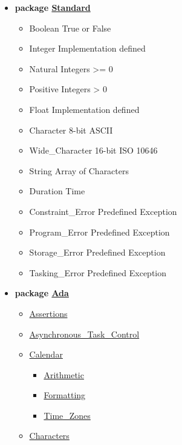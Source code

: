 \documentclass[english]{article}
\begin{document}
\begin{scriptsize}
\begin{multicols*}{5}
\begin{itemize}[leftmargin=0mm]
\item[] \textbf{package \href{http://www.ada-auth.org/standards/22rm/html/RM-A-1.html}{Standard}}
  \begin{itemize}[leftmargin=5mm]
  \item[] Boolean True or False
  \item[] Integer Implementation defined
  \item[] Natural Integers >= 0
  \item[] Positive Integers > 0
  \item[] Float Implementation defined
  \item[] Character 8-bit ASCII
  \item[] Wide\_Character 16-bit ISO 10646
  \item[] String Array of Characters
  \item[] Duration Time
  \item[] Constraint\_Error Predefined Exception
  \item[] Program\_Error Predefined Exception
  \item[] Storage\_Error Predefined Exception
  \item[] Tasking\_Error Predefined Exception
  \end{itemize}
\item[] \textbf{package \href{http://www.ada-auth.org/standards/22rm/html/RM-A-2.html}{Ada}}
  \begin{itemize}[leftmargin=5mm]
  \item[] \href{http://www.ada-auth.org/standards/22rm/html/RM-11-4-2.html}{Assertions}
  \item[] \href{http://www.ada-auth.org/standards/22rm/html/RM-D-11.html}{Asynchronous\_Task\_Control}
  \item[] \href{http://www.ada-auth.org/standards/22rm/html/RM-9-6.html}{Calendar}
	\begin{itemize}[leftmargin=5mm]
	\item[] \href{http://www.ada-auth.org/standards/22rm/html/RM-9-6-1.html}{Arithmetic}
	\item[] \href{http://www.ada-auth.org/standards/22rm/html/RM-9-6-1.html}{Formatting}
	\item[] \href{http://www.ada-auth.org/standards/22rm/html/RM-9-6-1.html}{Time\_Zones}
	\end{itemize}
  \item[] \href{http://www.ada-auth.org/standards/22rm/html/RM-A-3-1.html}{Characters}
	\begin{itemize}[leftmargin=5mm]

\end{itemize}
\end{itemize}
\end{itemize}
\end{multicols*}
\end{scriptsize}
\end{document}

